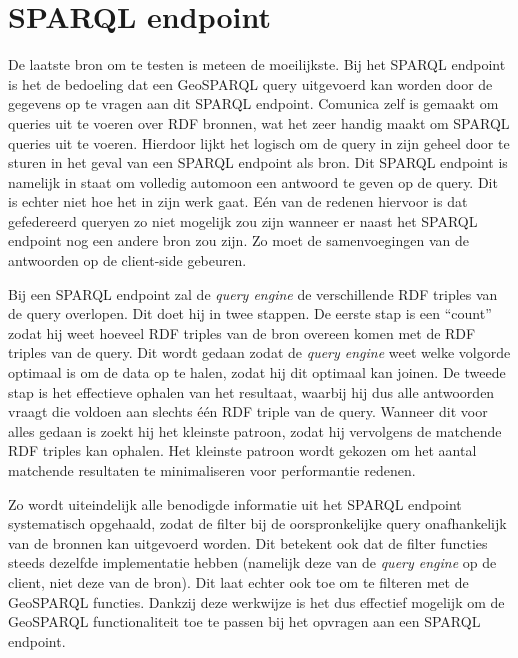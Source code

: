 \section{SPARQL endpoint}
\label{sec:impl_sparql_endpoint}
De laatste bron om te testen is meteen de moeilijkste. Bij het SPARQL endpoint is het de bedoeling dat een GeoSPARQL query uitgevoerd kan worden door de gegevens op te vragen aan dit SPARQL endpoint. Comunica zelf is gemaakt om queries uit te voeren over RDF bronnen, wat het zeer handig maakt om SPARQL queries uit te voeren. Hierdoor lijkt het logisch om de query in zijn geheel door te sturen in het geval van een SPARQL endpoint als bron. Dit SPARQL endpoint is namelijk in staat om volledig automoon een antwoord te geven op de query. Dit is echter niet hoe het in zijn werk gaat. Eén van de redenen hiervoor is dat gefedereerd queryen zo niet mogelijk zou zijn wanneer er naast het SPARQL endpoint nog een andere bron zou zijn. Zo moet de samenvoegingen van de antwoorden op de client-side gebeuren. 

Bij een SPARQL endpoint zal de \textit{query engine} de verschillende RDF triples van de query overlopen. Dit doet hij in twee stappen. De eerste stap is een ``count'' zodat hij weet hoeveel RDF triples van de bron overeen komen met de RDF triples van de query. Dit wordt gedaan zodat de \textit{query engine} weet welke volgorde optimaal is om de data op te halen, zodat hij dit optimaal kan joinen. De tweede stap is het effectieve ophalen van het resultaat, waarbij hij dus alle antwoorden vraagt die voldoen aan slechts één RDF triple van de query. Wanneer dit voor alles gedaan is zoekt hij het kleinste patroon, zodat hij vervolgens de matchende RDF triples kan ophalen. Het kleinste patroon wordt gekozen om het aantal matchende resultaten te minimaliseren voor performantie redenen.

Zo wordt uiteindelijk alle benodigde informatie uit het SPARQL endpoint systematisch opgehaald, zodat de filter bij de oorspronkelijke query onafhankelijk van de bronnen kan uitgevoerd worden. Dit betekent ook dat de filter functies steeds dezelfde implementatie hebben (namelijk deze van de \textit{query engine} op de client, niet deze van de bron). Dit laat echter ook toe om te filteren met de GeoSPARQL functies. Dankzij deze werkwijze is het dus effectief mogelijk om de GeoSPARQL functionaliteit toe te passen bij het opvragen aan een SPARQL endpoint.